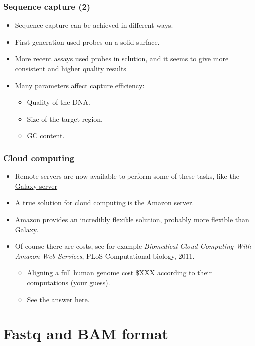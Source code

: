\documentclass{beamer}
\begin{document}
\begin{frame}
  \frametitle{Sequence capture (2)}
  \begin{itemize}
  \item Sequence capture can be achieved in different ways.
  \item First generation used probes on a solid surface.
  \item More recent assays used probes in solution, and it seems to give more consistent and higher quality results.
  \item Many parameters affect capture efficiency:
    \begin{itemize}
    \item Quality of the DNA.
    \item Size of the target region.
    \item GC content.
    \end{itemize}
  \end{itemize}
\end{frame}


\begin{frame}
  \frametitle{Cloud computing}
  \begin{itemize}
  \item Remote servers are now available to perform some of these tasks, like the \href{main.g2.bx.psu.edu)}{Galaxy server}
  \item A true solution for cloud computing is the \href{http://aws.amazon.com/ec2}{Amazon server}.
  \item Amazon provides an incredibly flexible solution, probably more flexible than Galaxy.
  \item Of course there are costs, see for example {\it Biomedical Cloud Computing With Amazon Web Services}, PLoS Computational biology, 2011.
    \begin{itemize}
    \item Aligning a full human genome cost \$XXX according to their computations (your guess).
    \item See the answer \href{http://www.ploscompbiol.org/article/info\%3Adoi\%2F10.1371\%2Fjournal.pcbi.1002147}{here}.
    \end{itemize}
  \end{itemize}
\end{frame}





\section{Fastq and BAM format}
\end{document}
